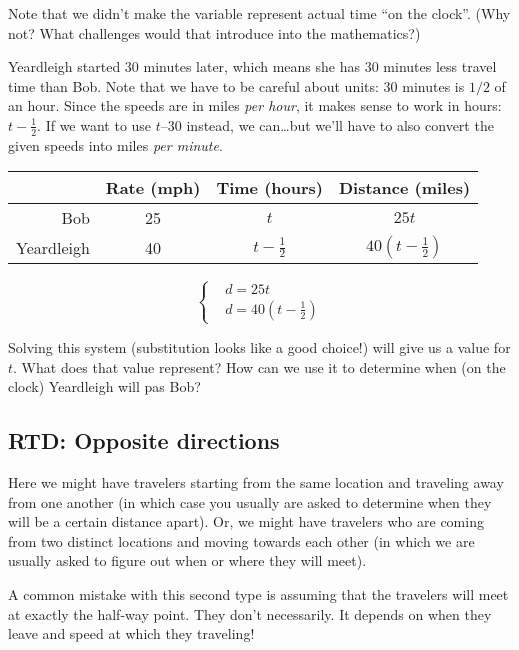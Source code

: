 Note that we didn't make the variable represent actual time ``on the clock''. (Why not? What challenges would that introduce into the mathematics?)

Yeardleigh started 30 minutes later, which means she has 30 minutes less travel time than Bob. Note that we have to be careful about units: 30 minutes is $1/2$ of an hour. Since the speeds are in miles \textit{per hour}, it makes sense to work in hours: $t-\frac{1}{2}$. If we want to use $t – 30$ instead, we can\ldots but we'll have to also convert the given speeds into miles \textit{per minute}.

\begin{center}
\begin{tabular}{r|ccc}
				& Rate (mph)			& Time (hours)		& Distance (miles)\\\hline
Bob				& 25					& $t$				& $25t$\\
Yeardleigh		& 40					& $t - \frac{1}{2}$	& $40\left(t - \frac{1}{2}\right)$\\
\end{tabular}
\end{center}

\[
\left\{%
\begin{aligned}
&d = 25t\\
&d = 40\left(t-\frac{1}{2}\right)
\end{aligned}
\right.
\]

Solving this system (substitution looks like a good choice!) will give us a value for $t$. What does that value represent? How can we use it to determine when (on the clock) Yeardleigh will pas Bob?

\subsection*{RTD: Opposite directions}

Here we might have travelers starting from the same location and traveling away from one another (in which case you usually are asked to determine when they will be a certain distance apart). Or, we might have travelers who are coming from two distinct locations and moving towards each other (in which we are usually asked to figure out when or where they will meet).

A common mistake with this second type is assuming that the travelers will meet at exactly the half-way point. They don't necessarily. It depends on when they leave and speed at which they traveling!

